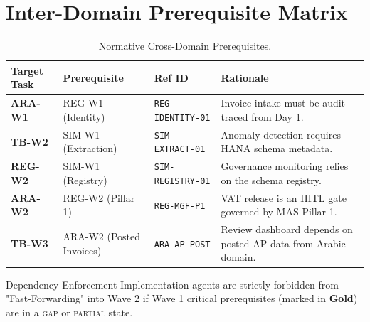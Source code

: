 \documentclass[12pt,a4paper,twoside]{report}
\begin{document}
\section{Inter-Domain Prerequisite Matrix}

\begin{table}[htbp]
\centering
\footnotesize
\caption{Normative Cross-Domain Prerequisites.}
\label{tab:prerequisites}
\begin{tabularx}{\textwidth}{@{}l l l X@{}}
\toprule
\textbf{Target Task} & \textbf{Prerequisite} & \textbf{Ref ID} & \textbf{Rationale} \\
\midrule
\rowcolor{sapmidnight!5}
\textbf{ARA-W1} & REG-W1 (Identity) & \texttt{REG-IDENTITY-01} & Invoice intake must be audit-traced from Day 1. \\
\textbf{TB-W2}  & SIM-W1 (Extraction) & \texttt{SIM-EXTRACT-01} & Anomaly detection requires HANA schema metadata. \\
\rowcolor{sapmidnight!5}
\textbf{REG-W2} & SIM-W1 (Registry) & \texttt{SIM-REGISTRY-01} & Governance monitoring relies on the schema registry. \\
\textbf{ARA-W2} & REG-W2 (Pillar 1) & \texttt{REG-MGF-P1} & VAT release is an HITL gate governed by MAS Pillar 1. \\
\rowcolor{sapmidnight!5}
\textbf{TB-W3}  & ARA-W2 (Posted Invoices) & \texttt{ARA-AP-POST} & Review dashboard depends on posted AP data from Arabic domain. \\
\bottomrule
\end{tabularx}
\end{table}

\begin{adrbox}{Dependency Enforcement}
Implementation agents are strictly forbidden from "Fast-Forwarding" into Wave 2 if Wave 1 critical prerequisites (marked in \textcolor{sapamber}{\textbf{Gold}}) are in a \textsc{gap} or \textsc{partial} state.
\end{adrbox}
\end{document}
